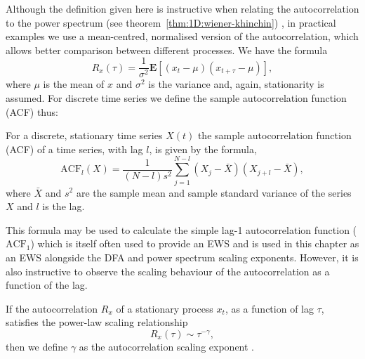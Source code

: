 {Although the definition given here is instructive when relating the autocorrelation to the power spectrum (see theorem~\ref{thm:1D:wiener-khinchin}) \citep{chatfield2016analysis}, in practical examples we use a mean-centred, normalised version of the autocorrelation, which allows better comparison between different processes. We have the formula
\begin{equation}
	\label{eqn:methods:auto_correlation_R_normalised}
	R_x(\tau) = \frac{1}{\sigma^2}\mathbf{E}\left[(x_t-\mu)(x_{t+\tau}-\mu)\right],
\end{equation}
where $\mu$ is the mean of $x$ and $\sigma^2$ is the variance and, again, stationarity is assumed. For discrete time series we define the sample autocorrelation function (ACF) thus:
\begin{definition}
	For a discrete, stationary time series $X(t)$ the sample autocorrelation function (ACF) of a time series, with lag $l$, is given by the formula,
	\begin{equation}
	\label{eqn:1D:ACF_formula}
	\text{ACF}_{l}(X) = \frac{1}{(N-l)s^2}\sum_{j=1}^{N-l}(X_{j}-\bar{X})(X_{j+l} - \bar{X}),
	\end{equation} 
	where $\bar{X}$ and $s^2$ are the sample mean and sample standard variance of the series $X$ and $l$ is the lag.
\end{definition} 

This formula may be used to calculate the simple lag-1 autocorrelation function ($\text{ACF}_{1}$) which is itself often used to provide an EWS \citep{held2004} and is used in this chapter as an EWS alongside the DFA and power spectrum scaling exponents. However, it is also instructive to observe the scaling behaviour of the autocorrelation as a function of the lag.

\begin{definition}
	\label{def:1D:ACFexponent}
	If the autocorrelation $R_x$ of a stationary process $x_t$, as a function of lag $\tau$, satisfies the power-law scaling relationship
	\begin{equation} 
	R_x(\tau) \sim \tau^{-\gamma}, \label{eqn:1D:ACF_scaling_equation} 
	\end{equation}
	then we define $\gamma$ as the autocorrelation scaling exponent \citep{makse1996}.
\end{definition}

}
